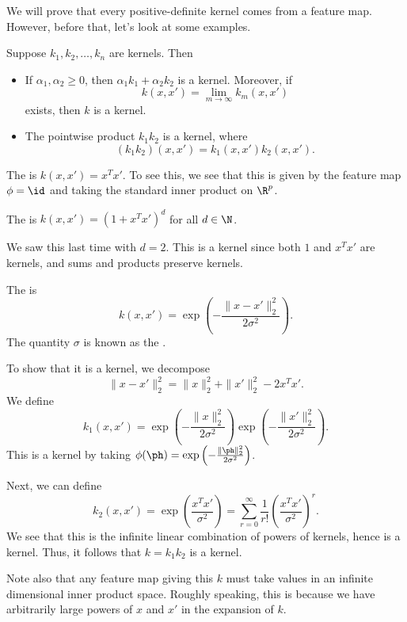 \documentclass[a4paper]{article}
\begin{document}
We will prove that every positive-definite kernel comes from a feature map. However, before that, let's look at some examples.
\begin{eg}
  Suppose $k_1, k_2, \ldots, k_n$ are kernels. Then
  \begin{itemize}
    \item If $\alpha_1, \alpha_2 \geq 0$, then $\alpha_1 k_1 + \alpha_2 k_2$ is a kernel. Moreover, if
      \[
        k(x, x') = \lim_{m \to \infty} k_m(x, x')
      \]
      exists, then $k$ is a kernel.
    \item The pointwise product $k_1k_2$ is a kernel, where
      \[
        (k_1 k_2)(x, x') = k_1(x, x') k_2(x, x').
      \]
  \end{itemize}
\end{eg}

\begin{eg}
  The  is $k(x, x') = x^T x'$. To see this, we see that this is given by the feature map $\phi = \id$ and taking the standard inner product on $\R^p$.
\end{eg}

\begin{eg}
  The  is $k(x, x') = (1 + x^T x')^d$ for all $d \in \N$.

  We saw this last time with $d = 2$. This is a kernel since both $1$ and $x^T x'$ are kernels, and sums and products preserve kernels.
\end{eg}

\begin{eg}
  The  is
  \[
    k(x, x') = \exp\left(- \frac{\|x- x'\|^2_2}{2\sigma^2}\right).
  \]
  The quantity $\sigma$ is known as the .

  To show that it is a kernel, we decompose
  \[
    \|x - x'\|_2^2 = \|x\|_2^2 + \|x'\|_2^2 - 2 x^T x'.
  \]
  We define
  \[
    k_1(x, x') = \exp\left(-\frac{\|x\|_2^2}{2\sigma^2}\right)\exp\left(-\frac{\|x'\|_2^2}{2\sigma^2}\right).
  \]
  This is a kernel by taking $\phi(\ph) = \exp\left(-\frac{\|\ph\|_2^2}{2\sigma^2}\right)$.

  Next, we can define
  \[
    k_2(x, x') = \exp\left(\frac{x^T x'}{\sigma^2}\right) = \sum_{r = 0}^\infty \frac{1}{r!} \left(\frac{x^T x'}{\sigma^2}\right)^r.
  \]
  We see that this is the infinite linear combination of powers of kernels, hence is a kernel. Thus, it follows that $k = k_1 k_2$ is a kernel.

  Note also that any feature map giving this $k$ must take values in an infinite dimensional inner product space. Roughly speaking, this is because we have arbitrarily large powers of $x$ and $x'$ in the expansion of $k$.
\end{eg}
\end{document}
